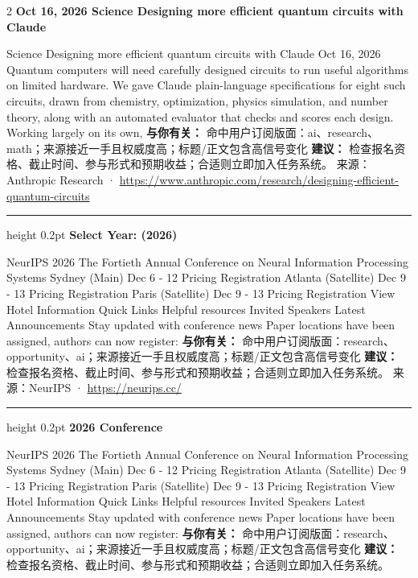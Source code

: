 \documentclass[10.5pt]{ctexart}
\begin{document}
\begin{multicols}{2}
{\large\bfseries Oct 16, 2026 Science Designing more efficient quantum circuits with Claude}\par
Science Designing more efficient quantum circuits with Claude Oct 16, 2026 Quantum computers will need carefully designed circuits to run useful algorithms on limited hardware. We gave Claude plain-language specifications for eight such circuits, drawn from chemistry, optimization, physics simulation, and number theory, along with an automated evaluator that checks and scores each design. Working largely on its own, 
\textbf{与你有关：} 命中用户订阅版面：ai、research、math；来源接近一手且权威度高；标题/正文包含高信号变化
\textbf{建议：} 检查报名资格、截止时间、参与形式和预期收益；合适则立即加入任务系统。
{\footnotesize\color{ormuted} 来源：Anthropic Research · \url{https://www.anthropic.com/research/designing-efficient-quantum-circuits}}
\vspace{2mm}
\hrule height 0.2pt
\vspace{2mm}
{\large\bfseries Select Year: (2026)}\par
NeurIPS 2026 The Fortieth Annual Conference on Neural Information Processing Systems Sydney (Main) Dec 6 - 12 Pricing Registration Atlanta (Satellite) Dec 9 - 13 Pricing Registration Paris (Satellite) Dec 9 - 13 Pricing Registration View Hotel Information Quick Links Helpful resources Invited Speakers Latest Announcements Stay updated with conference news Paper locations have been assigned, authors can now register: 
\textbf{与你有关：} 命中用户订阅版面：research、opportunity、ai；来源接近一手且权威度高；标题/正文包含高信号变化
\textbf{建议：} 检查报名资格、截止时间、参与形式和预期收益；合适则立即加入任务系统。
{\footnotesize\color{ormuted} 来源：NeurIPS · \url{https://neurips.cc/}}
\vspace{2mm}
\hrule height 0.2pt
\vspace{2mm}
{\large\bfseries 2026 Conference}\par
NeurIPS 2026 The Fortieth Annual Conference on Neural Information Processing Systems Sydney (Main) Dec 6 - 12 Pricing Registration Atlanta (Satellite) Dec 9 - 13 Pricing Registration Paris (Satellite) Dec 9 - 13 Pricing Registration View Hotel Information Quick Links Helpful resources Invited Speakers Latest Announcements Stay updated with conference news Paper locations have been assigned, authors can now register: 
\textbf{与你有关：} 命中用户订阅版面：research、opportunity、ai；来源接近一手且权威度高；标题/正文包含高信号变化
\textbf{建议：} 检查报名资格、截止时间、参与形式和预期收益；合适则立即加入任务系统。

\end{multicols}
\end{document}
